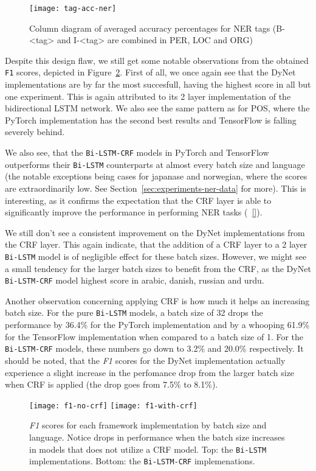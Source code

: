 \begin{figure}[h!]
    \texttt{[image: tag-acc-ner]}
    \caption{Column diagram of averaged accuracy percentages for NER tags
        (B-<tag> and I-<tag> are combined in PER, LOC and ORG)
    }\label{chart:tag-acc-ner}
\end{figure}

Despite this design flaw, we still get some notable observations from the
obtained \texttt{F1} scores, depicted in
Figure~\ref{chart:f1-by-batch-and-lang}.  First of all, we once again see that
the DyNet implementations are by far the most succesfull, having the highest
score in all but one experiment. This is again attributed to its 2 layer
implementation of the bidirectional LSTM network. We also see the same pattern
as for POS, where the PyTorch implementation has the second best results and
TensorFlow is falling severely behind.

We also see, that the \texttt{Bi-LSTM-CRF} models in PyTorch and TensorFlow
outperforms their \texttt{Bi-LSTM} counterparts at almost every batch size and
language (the notable exceptions being cases for japanase and norwegian, where
the scores are extraordinarily low. See Section~\ref{sec:experiments-ner-data}
for more). This is interesting, as it confirms the expectation that the CRF
layer is able to significantly improve the performance in performing NER tasks
(~\ref{}).

We still don't see a consistent improvement on the DyNet implementations from
the CRF layer. This again indicate, that the addition of a CRF
layer to a 2 layer \texttt{Bi-LSTM} model is of negligible effect for these
batch sizes. However, we might see a small tendency for the larger batch sizes
to benefit from the CRF, as the DyNet \texttt{Bi-LSTM-CRF} model highest score
in arabic, danish, russian and urdu.

Another observation concerning applying CRF is how much it helps an increasing
batch size. For the pure \texttt{Bi-LSTM} models, a batch size of 32 drops the
performance by 36.4\% for the PyTorch implementation and by a whooping 61.9\%
for the TensorFlow implementation when compared to a batch size of 1. For the
\texttt{Bi-LSTM-CRF} models, these numbers go down to 3.2\% and 20.0\%
respectively. It should be noted, that the \textit{F1} scores for the DyNet
implementation actually experience a slight increase in the perfomance drop from
the larger batch size when CRF is applied (the drop goes from 7.5\% to 8.1\%).

\begin{figure}[h!]
    \texttt{[image: f1-no-crf]}
    \texttt{[image: f1-with-crf]}
    \caption{\textit{F1} scores for each framework implementation by batch size
        and language. Notice drops in performance when the batch size increases
        in models that does not utilize a CRF model. Top: the \texttt{Bi-LSTM}
        implementations. Bottom: the \texttt{Bi-LSTM-CRF} implemenations.
    }\label{chart:f1-by-batch-and-lang}
\end{figure}

